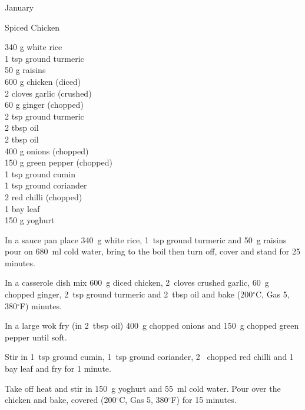 \begin{menu}{January}
    \begin{recipe}{2}{Spiced Chicken}%
		\begin{ingredients}
		340 g white rice  \\
	1 tsp ground turmeric  \\
	50 g raisins  \\
	600 g chicken (diced) \\
	2 cloves garlic (crushed) \\
	60 g ginger (chopped) \\
	2 tsp ground turmeric  \\
	2 tbsp oil  \\
	2 tbsp oil  \\
	400 g onions (chopped) \\
	150 g green pepper (chopped) \\
	1 tsp ground cumin  \\
	1 tsp ground coriander  \\
	2  red chilli (chopped) \\
	1  bay leaf  \\
	150 g yoghurt  \\
	
		\end{ingredients}
	
	
    \begin{instructions}
    \item 
    In a
    sauce pan
    place
    340~g  white rice,
    1~tsp  ground turmeric
    and
    50~g  raisins
    pour on
    680~ml  cold water,
    bring to the boil then turn off, cover and stand for 25 minutes.
  \item 
        In a casserole dish mix
        600~g diced chicken,
        2~cloves crushed garlic,
        60~g chopped ginger,
        2~tsp  ground turmeric and
        2~tbsp  oil
        and
        bake (200$^{\circ}$C, Gas 5, 380$^{\circ}$F) minutes.
      \item 
        In a large wok fry
        (in 2~tbsp  oil)
        400~g chopped onions
        and
        150~g chopped green pepper
        until soft.
      \item 
        Stir in
        1~tsp  ground cumin,
        1~tsp  ground coriander,
        2~ chopped red chilli
        and
        1~  bay leaf
        and fry for 1 minute.
      \item 
        Take off heat
        and
        stir in
        150~g  yoghurt
        and
        55~ml  cold water.
        Pour over the chicken
        and bake,
        covered (200$^{\circ}$C, Gas 5, 380$^{\circ}$F) for 15 minutes.
      

\end{instructions}
\end{recipe}
\end{menu}
